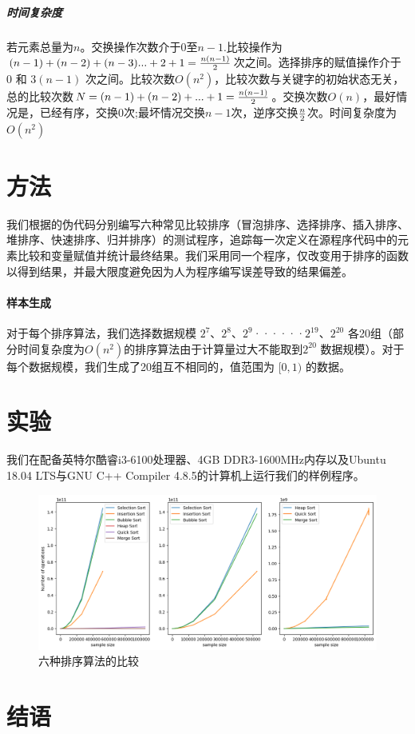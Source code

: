 \documentclass[UTF8]{ctexart}
\begin{document}
\subparagraph{时间复杂度}
若元素总量为$n$。交换操作次数介于$0$至$n-1$.比较操作为$(n-1)+(n-2)+(n-3)...+2+1={n (n-1) \over 2} $次之间。选择排序的赋值操作介于 $0$ 和 $3 (n - 1)$ 次之间。比较次数$O(n^2)$，比较次数与关键字的初始状态无关，总的比较次数$N = (n-1)+(n-2)+...+1 = {n (n-1) \over 2}$。交换次数$O(n)$，最好情况是，已经有序，交换0次;最坏情况交换$n-1$次，逆序交换$n \over 2$次。时间复杂度为$O(n^2)$

\section{方法}
我们根据\citeauthor{cormen1990introduction}的伪代码分别编写六种常见比较排序（冒泡排序、选择排序、插入排序、堆排序、快速排序、归并排序）的测试程序，追踪每一次定义在源程序代码中的元素比较和变量赋值并统计最终结果。我们采用同一个程序，仅改变用于排序的函数以得到结果，并最大限度避免因为人为程序编写误差导致的结果偏差。

\paragraph{样本生成}
对于每个排序算法，我们选择数据规模 $2^7$、$2^8$、$2^9$······$2^{19}$、$2^{20}$ 各20组（部分时间复杂度为$O(n^2)$的排序算法由于计算量过大不能取到$2^{20}$ 数据规模）。对于每个数据规模，我们生成了20组互不相同的，值范围为  $[0, 1)$ 的数据。

\section{实验}
我们在配备英特尔\textregistered 酷睿\texttrademark i3-6100处理器、4GB DDR3-1600MHz内存以及Ubuntu 18.04 LTS与GNU C++ Compiler 4.8.5的计算机上运行我们的样例程序。

\begin{figure}[h]
\includegraphics[width=\textwidth]{fig1.png}
\caption{六种排序算法的比较}
\end{figure}

\section{结语}

\renewcommand{\refname}{参考文献}

\end{document}
